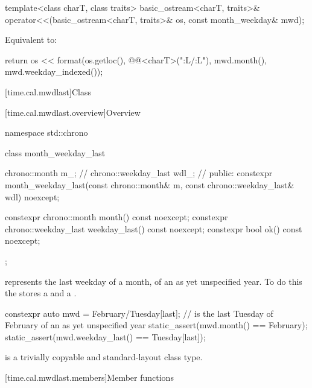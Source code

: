 %
\begin{itemdecl}
template<class charT, class traits>
  basic_ostream<charT, traits>&
    operator<<(basic_ostream<charT, traits>& os, const month_weekday& mwd);
\end{itemdecl}

\begin{itemdescr}
\pnum
\effects
Equivalent to:
\begin{codeblock}
return os << format(os.getloc(), @@<charT>("{:L}/{:L}"),
                    mwd.month(), mwd.weekday_indexed());
\end{codeblock}
\end{itemdescr}

[time.cal.mwdlast]{Class }

[time.cal.mwdlast.overview]{Overview}

\begin{codeblock}
namespace std::chrono {
  class month_weekday_last {
    chrono::month        m_;    // \expos
    chrono::weekday_last wdl_;  // \expos
  public:
    constexpr month_weekday_last(const chrono::month& m,
                                 const chrono::weekday_last& wdl) noexcept;

    constexpr chrono::month        month()        const noexcept;
    constexpr chrono::weekday_last weekday_last() const noexcept;
    constexpr bool ok() const noexcept;
  };
}
\end{codeblock}

\pnum
{} represents the last weekday of a month,
of an as yet unspecified year.
To do this the  stores a  and a .

\pnum
\begin{example}
\begin{codeblock}
constexpr auto mwd
    = February/Tuesday[last];   //  is the last Tuesday of February of an as yet unspecified year
static_assert(mwd.month() == February);
static_assert(mwd.weekday_last() == Tuesday[last]);
\end{codeblock}
\end{example}

\pnum
{} is a trivially copyable and standard-layout class type.

[time.cal.mwdlast.members]{Member functions}


